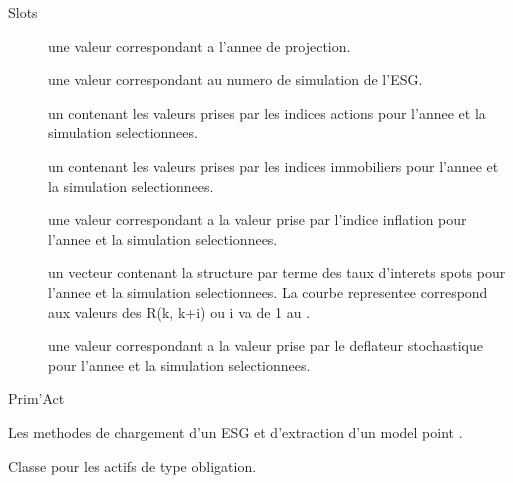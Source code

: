 \documentclass[a4paper]{book}
\begin{document}
\begin{Section}{Slots}

\begin{description}

\item[] une valeur  correspondant a l'annee de projection.

\item[] une valeur  correspondant au numero de simulation de l'ESG.

\item[] un  contenant les valeurs prises par les indices actions pour l'annee et la
simulation selectionnees.

\item[] un  contenant les valeurs prises par les indices immobiliers pour l'annee et la
simulation selectionnees.

\item[] une valeur  correspondant a la valeur prise par l'indice inflation
pour l'annee et la simulation selectionnees.

\item[] un vecteur  contenant la structure par terme des taux d'interets spots
pour l'annee et la simulation selectionnees. La courbe representee correspond aux valeurs des
R(k, k+i) ou i va de 1 au .

\item[] une valeur  correspondant a la valeur prise par le deflateur stochastique
pour l'annee et la simulation selectionnees.

\end{description}
\end{Section}
%
\begin{Author}\relax
Prim'Act
\end{Author}
%
\begin{SeeAlso}\relax
Les methodes de chargement d'un ESG  et d'extraction d'un model point .
\end{SeeAlso}
%
\begin{Description}\relax
Classe pour les actifs de type obligation.
\end{Description}
\end{document}

